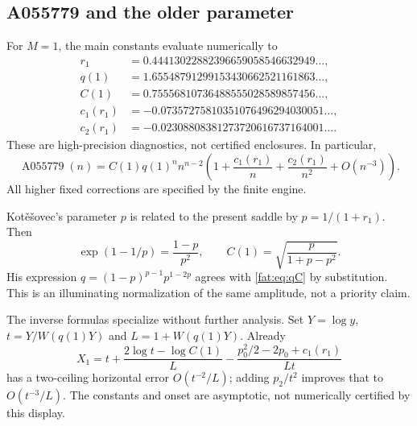 \documentclass[11pt,letterpaper]{article}
\numberwithin{equation}{section}
\theoremstyle{remark}\newtheorem{remark}[theorem]{Remark}
\begin{document}
\subsection{A055779 and the older parameter}
For $M=1$, the main constants evaluate numerically to
\begin{align*}
 r_1&=0.44413022882396659058546632949\ldots,\\
 q(1)&=1.65548791299153430662521161863\ldots,\\
 C(1)&=0.75556810736488555028589857456\ldots,\\
 c_1(r_1)&=-0.07357275810351076496294030051\ldots,\\
 c_2(r_1)&=-0.02308808381273720616737164001\ldots.
\end{align*}
These are high-precision diagnostics, not certified enclosures. In particular,
\[
 \operatorname{A055779}(n)=C(1)q(1)^n n^{n-2}
 \left(1+\frac{c_1(r_1)}n+\frac{c_2(r_1)}{n^2}+O(n^{-3})\right).
\]
All higher fixed corrections are specified by the finite engine.

Kot\v{e}\v{s}ovec's parameter $p$ is related to the present saddle by $p=1/(1+r_1)$. Then
\[
 \exp(1-1/p)=\frac{1-p}{p^2},\qquad
 C(1)=\sqrt{\frac{p}{1+p-p^2}}.
\]
His expression $q=(1-p)^{p-1}p^{1-2p}$ agrees with \eqref{fat:eq:qC} by substitution. This is an illuminating normalization of the same amplitude, not a priority claim.

The inverse formulas specialize without further analysis. Set $Y=\log y$, $t=Y/W(q(1)Y)$ and $L=1+W(q(1)Y)$. Already
\[
 X_1=t+\frac{2\log t-\log C(1)}L
 -\frac{p_0^2/2-2p_0+c_1(r_1)}{Lt}
\]
has a two-ceiling horizontal error $O(t^{-2}/L)$; adding $p_2/t^2$ improves that to $O(t^{-3}/L)$. The constants and onset are asymptotic, not numerically certified by this display.
\end{document}
